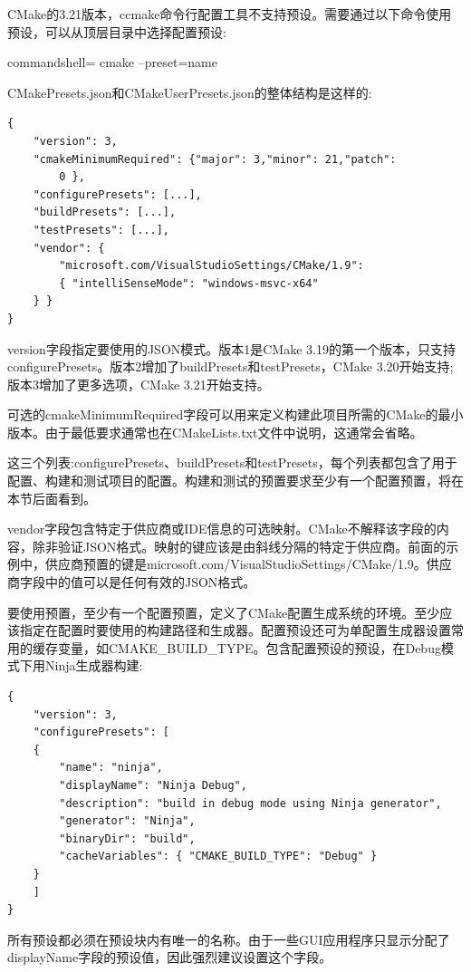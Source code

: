 CMake的3.21版本，ccmake命令行配置工具不支持预设。需要通过以下命令使用预设，可以从顶层目录中选择配置预设:

\begin{tcblisting}{commandshell={}}
cmake --preset=name
\end{tcblisting}

CMakePresets.json和CMakeUserPresets.json的整体结构是这样的:

\begin{lstlisting}[style=styleCMake]
{
	"version": 3,
	"cmakeMinimumRequired": {"major": 3,"minor": 21,"patch":
		0 },
	"configurePresets": [...],
	"buildPresets": [...],
	"testPresets": [...],
	"vendor": {
		"microsoft.com/VisualStudioSettings/CMake/1.9":
		{ "intelliSenseMode": "windows-msvc-x64"
	} }
}
\end{lstlisting}

version字段指定要使用的JSON模式。版本1是CMake 3.19的第一个版本，只支持configurePresets。版本2增加了buildPresets和testPresets，CMake 3.20开始支持;版本3增加了更多选项，CMake 3.21开始支持。

可选的cmakeMinimumRequired字段可以用来定义构建此项目所需的CMake的最小版本。由于最低要求通常也在CMakeLists.txt文件中说明，这通常会省略。

这三个列表:configurePresets、buildPresets和testPresets，每个列表都包含了用于配置、构建和测试项目的配置。构建和测试的预置要求至少有一个配置预置，将在本节后面看到。

vendor字段包含特定于供应商或IDE信息的可选映射。CMake不解释该字段的内容，除非验证JSON格式。映射的键应该是由斜线分隔的特定于供应商。前面的示例中，供应商预置的键是microsoft.com/VisualStudioSettings/CMake/1.9。供应商字段中的值可以是任何有效的JSON格式。

要使用预置，至少有一个配置预置，定义了CMake配置生成系统的环境。至少应该指定在配置时要使用的构建路径和生成器。配置预设还可为单配置生成器设置常用的缓存变量，如CMAKE\_BUILD\_TYPE。包含配置预设的预设，在Debug模式下用Ninja生成器构建:

\begin{lstlisting}[style=styleCMake]
{
	"version": 3,
	"configurePresets": [
	{
		"name": "ninja",
		"displayName": "Ninja Debug",
		"description": "build in debug mode using Ninja	generator",
		"generator": "Ninja",
		"binaryDir": "build",
		"cacheVariables": { "CMAKE_BUILD_TYPE": "Debug" }
	}
	]
}
\end{lstlisting}

所有预设都必须在预设块内有唯一的名称。由于一些GUI应用程序只显示分配了displayName字段的预设值，因此强烈建议设置这个字段。

